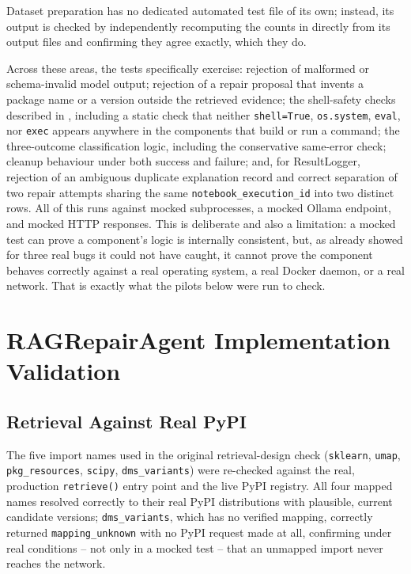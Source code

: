 Dataset preparation has no dedicated automated test file of its own;
instead, its output is checked by independently recomputing the counts in
 directly from its output files and confirming
they agree exactly, which they do.

Across these areas, the tests specifically exercise: rejection of malformed
or schema-invalid model output; rejection of a repair proposal that invents
a package name or a version outside the retrieved evidence; the shell-safety
checks described in , including a static check that
neither \texttt{shell=True}, \texttt{os.system}, \texttt{eval}, nor
\texttt{exec} appears anywhere in the components that build or run a
command; the three-outcome classification logic, including the conservative
same-error check; cleanup behaviour under both success and failure; and, for
ResultLogger, rejection of an ambiguous duplicate explanation record and
correct separation of two repair attempts sharing the same
\texttt{notebook\_execution\_id} into two distinct rows. All
of this runs against mocked subprocesses, a mocked Ollama endpoint, and
mocked HTTP responses. This is deliberate and also a limitation: a mocked
test can prove a component's logic is internally consistent, but, as
 already showed for three real bugs it could not
have caught, it cannot prove the component behaves correctly against a real
operating system, a real Docker daemon, or a real network. That is exactly
what the pilots below were run to check.

\section{RAGRepairAgent Implementation Validation}
\label{sec:v-i4}

\subsection{Retrieval Against Real PyPI}

The five import names used in the original retrieval-design check
(\texttt{sklearn}, \texttt{umap}, \texttt{pkg\_resources}, \texttt{scipy},
\texttt{dms\_variants}) were re-checked against the real, production
\texttt{retrieve()} entry point and the live PyPI registry. All four mapped
names resolved correctly to their real PyPI distributions with plausible,
current candidate versions; \texttt{dms\_variants}, which has no verified
mapping, correctly returned \texttt{mapping\_unknown} with no PyPI request
made at all, confirming under real conditions -- not only in a mocked test
-- that an unmapped import never reaches the network.

